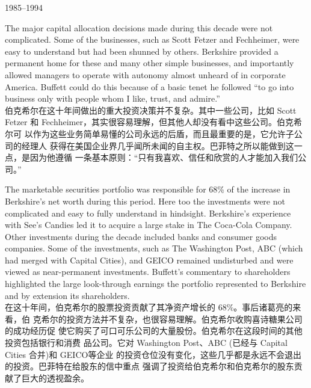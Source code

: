 \begin{section}{1985--1994}
\begin{verseparallel}
  {
    The major capital allocation decisions made during this decade were not
    complicated. Some of the businesses, such as Scott Fetzer and Fechheimer,
    were easy to understand but had been shunned by others. Berkshire provided a
    permanent home for these and many other simple businesses, and importantly
    allowed managers to operate with autonomy almost unheard of in corporate
    America. Buffett could do this because of a basic tenet he followed ``to go
    into business only with people whom I like, trust, and admire.'' \\
  }
  {
    伯克希尔在这十年间做出的重大投资决策并不复杂。其中一些公司，比如 Scott
    Fetzer 和 Fechheimer，其实很容易理解，但其他人却没有看中这些公司。伯克希尔可
    以作为这些业务简单易懂的公司永远的后盾，而且最重要的是，它允许子公司的经理人
    获得在美国企业界几乎闻所未闻的自主权。巴菲特之所以能做到这一点，是因为他遵循
    一条基本原则：“只有我喜欢、信任和欣赏的人才能加入我们公司。”
  }
\end{verseparallel}

\begin{verseparallel}
  {
    The marketable securities portfolio was responsible for 68\% of the increase
    in Berkshire's net worth during this period. Here too the investments were
    not complicated and easy to fully understand in hindsight. Berkshire's
    experience with See's Candies led it to acquire a large stake in The
    Coca-Cola Company. Other investments during the decade included banks and
    consumer goods companies. Some of the investments, such as The Washington
    Post, ABC (which had merged with Capital Cities), and GEICO remained
    undisturbed and were viewed as near-permanent investments. Buffett's
    commentary to shareholders highlighted the large look-through
    earnings the portfolio
    represented to
    Berkshire and by extension its shareholders. \\
  }
  {
    在这十年间，伯克希尔的股票投资贡献了其净资产增长的 68\%。事后诸葛亮的来看，伯
    克希尔的投资方法并不复杂，也很容易理解。伯克希尔收购喜诗糖果公司的成功经历促
    使它购买了可口可乐公司的大量股份。伯克希尔在这段时间的其他投资包括银行和消费
    品公司。它对 Washington Post、ABC (已经与 Capital Cities 合并)和 GEICO等企业
    的投资仓位没有变化，这些几乎都是永远不会退出的投资。巴菲特在给股东的信中重点
    强调了投资给伯克希尔和伯克希尔的股东贡献了巨大的透视盈余。
  }
\end{verseparallel}


\end{section}
